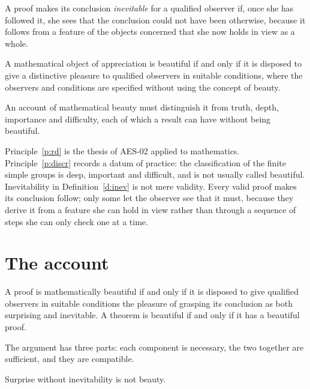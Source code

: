 \documentclass{situationist-preprint}
\begin{document}
\begin{definition}[Inevitability]\label{d:inev}
A proof makes its conclusion \emph{inevitable} for a qualified observer if, once she has followed it, she sees that the conclusion could not have been otherwise, because it follows from a feature of the objects concerned that she now holds in view as a whole.
\end{definition}

\begin{principle}\label{p:rd}
A mathematical object of appreciation is beautiful if and only if it is disposed to give a distinctive pleasure to qualified observers in suitable conditions, where the observers and conditions are specified without using the concept of beauty.
\end{principle}

\begin{principle}[Discrimination]\label{p:discr}
An account of mathematical beauty must distinguish it from truth, depth, importance and difficulty, each of which a result can have without being beautiful.
\end{principle}

Principle~\ref{p:rd} is the thesis of AES-02 applied to mathematics. Principle~\ref{p:discr} records a datum of practice: the classification of the finite simple groups is deep, important and difficult, and is not usually called beautiful. Inevitability in Definition~\ref{d:inev} is not mere validity. Every valid proof makes its conclusion follow; only some let the observer see that it must, because they derive it from a feature she can hold in view rather than through a sequence of steps she can only check one at a time.

\section{The account}

\begin{theorem}\label{t:main}
A proof is mathematically beautiful if and only if it is disposed to give qualified observers in suitable conditions the pleasure of grasping its conclusion as both surprising and inevitable. A theorem is beautiful if and only if it has a beautiful proof.
\end{theorem}

The argument has three parts: each component is necessary, the two together are sufficient, and they are compatible.

\begin{lemma}\label{l:surp}
Surprise without inevitability is not beauty.
\end{lemma}
\end{document}
